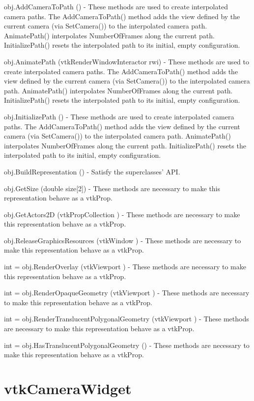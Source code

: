 \begin{DoxyItemize}
\item {\ttfamily obj.\-Add\-Camera\-To\-Path ()} -\/ These methods are used to create interpolated camera paths. The Add\-Camera\-To\-Path() method adds the view defined by the current camera (via Set\-Camera()) to the interpolated camera path. Animate\-Path() interpolates Number\-Of\-Frames along the current path. Initialize\-Path() resets the interpolated path to its initial, empty configuration.  
\item {\ttfamily obj.\-Animate\-Path (vtk\-Render\-Window\-Interactor rwi)} -\/ These methods are used to create interpolated camera paths. The Add\-Camera\-To\-Path() method adds the view defined by the current camera (via Set\-Camera()) to the interpolated camera path. Animate\-Path() interpolates Number\-Of\-Frames along the current path. Initialize\-Path() resets the interpolated path to its initial, empty configuration.  
\item {\ttfamily obj.\-Initialize\-Path ()} -\/ These methods are used to create interpolated camera paths. The Add\-Camera\-To\-Path() method adds the view defined by the current camera (via Set\-Camera()) to the interpolated camera path. Animate\-Path() interpolates Number\-Of\-Frames along the current path. Initialize\-Path() resets the interpolated path to its initial, empty configuration.  
\item {\ttfamily obj.\-Build\-Representation ()} -\/ Satisfy the superclasses' A\-P\-I.  
\item {\ttfamily obj.\-Get\-Size (double size\mbox{[}2\mbox{]})} -\/ These methods are necessary to make this representation behave as a vtk\-Prop.  
\item {\ttfamily obj.\-Get\-Actors2\-D (vtk\-Prop\-Collection )} -\/ These methods are necessary to make this representation behave as a vtk\-Prop.  
\item {\ttfamily obj.\-Release\-Graphics\-Resources (vtk\-Window )} -\/ These methods are necessary to make this representation behave as a vtk\-Prop.  
\item {\ttfamily int = obj.\-Render\-Overlay (vtk\-Viewport )} -\/ These methods are necessary to make this representation behave as a vtk\-Prop.  
\item {\ttfamily int = obj.\-Render\-Opaque\-Geometry (vtk\-Viewport )} -\/ These methods are necessary to make this representation behave as a vtk\-Prop.  
\item {\ttfamily int = obj.\-Render\-Translucent\-Polygonal\-Geometry (vtk\-Viewport )} -\/ These methods are necessary to make this representation behave as a vtk\-Prop.  
\item {\ttfamily int = obj.\-Has\-Translucent\-Polygonal\-Geometry ()} -\/ These methods are necessary to make this representation behave as a vtk\-Prop.  
\end{DoxyItemize}\hypertarget{vtkwidgets_vtkcamerawidget}{}\section{vtk\-Camera\-Widget}\label{vtkwidgets_vtkcamerawidget}
